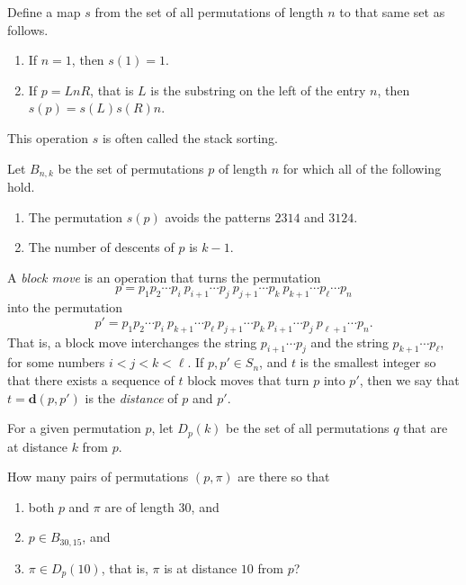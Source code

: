 Define a map $s$ from the set of all permutations of length $n$ to that same set as follows.
\begin{enumerate}
\item If $n=1$, then $s(1)=1$.
\item If $p=LnR$, that is $L$ is the substring on the left of the entry $n$, then $s(p)=s(L)s(R)n$.
\end{enumerate}
This operation $s$ is often called the stack sorting.

Let $B_{n,k}$ be the set of permutations $p$ of length $n$ for which all of the following hold.
\begin{enumerate}
\item The permutation $s(p)$ avoids the patterns $2314$ and $3124$.
\item The number of descents of $p$ is $k-1$.
\end{enumerate}

A \emph{block move} is an operation that turns the permutation
\[
p = p_1 p_2 \cdots p_i\ p_{i+1}\cdots p_j\ p_{j+1}\cdots p_k\ p_{k+1}\cdots p_\ell \cdots p_n
\]
into the permutation
\[
p' = p_1 p_2 \cdots p_i\ p_{k+1}\cdots p_\ell\ p_{j+1}\cdots p_k\ p_{i+1}\cdots p_j\ p_{\ell+1}\cdots p_n.
\]
That is, a block move interchanges the string $p_{i+1}\cdots p_j$ and the string $p_{k+1}\cdots p_{\ell}$, for some numbers $i<j<k<\ell$. If $p,p'\in S_n$, and $t$ is the smallest integer so that there exists a sequence of $t$ block moves that turn $p$ into $p'$, then we say that $t=\mathbf{d}(p,p')$ is the \emph{distance} of $p$ and $p'$.

For a given permutation $p$, let $D_{p}(k)$ be the set of all permutations $q$ that are at distance $k$ from $p$.

How many pairs of permutations $(p,\pi)$ are there so that
\begin{enumerate}
\item both $p$ and $\pi$ are of length $30$, and
\item $p\in B_{30,15}$, and
\item $\pi \in D_p(10)$, that is, $\pi$ is at distance $10$ from $p$?
\end{enumerate}
